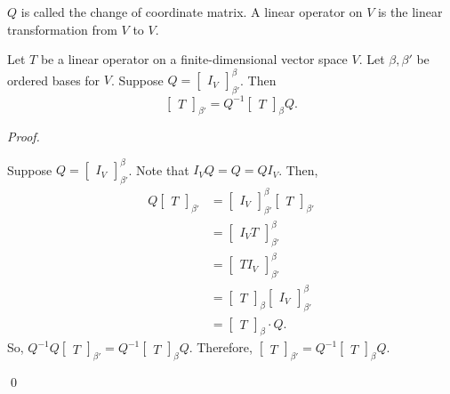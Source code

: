 \documentclass[12pt]{article}
\newenvironment{theorem}[2][Theorem]{\begin{trivlist}
\item[\hskip \labelsep {\bfseries #1}\hskip \labelsep {\bfseries #2.}]}{\end{trivlist}}
\newenvironment{sol}
    {\emph{Proof.}
    }
    {
    \qed
    }
\begin{document}
\noindent $Q$ is called the change of coordinate matrix. A linear operator on $V$ is the linear transformation from $V$ to $V$.

\begin{theorem}{2.23}
Let $T$ be a linear operator on a finite-dimensional vector space $V$. Let $\beta, \beta'$ be ordered bases for $V$. Suppose $Q = \begin{bmatrix} I_V \end{bmatrix}_{\beta'}^\beta$. Then $$\begin{bmatrix} T \end{bmatrix}_{\beta'} = Q^{-1}\begin{bmatrix} T \end{bmatrix}_\beta Q.$$
\end{theorem}

\begin{sol}
Suppose $Q = \begin{bmatrix} I_V \end{bmatrix}_{\beta '}^\beta$. Note that $I_VQ = Q = QI_V$. Then, \begin{align*}
    Q\begin{bmatrix} T \end{bmatrix}_{\beta '} &= \begin{bmatrix} I_V \end{bmatrix}_{\beta '}^\beta\begin{bmatrix} T \end{bmatrix}_{\beta '} \\
    &= \begin{bmatrix} I_VT \end{bmatrix}_{\beta '}^\beta \\
    &= \begin{bmatrix} TI_V \end{bmatrix}_{\beta '}^\beta \\
    &= \begin{bmatrix} T \end{bmatrix}_\beta \begin{bmatrix} I_V \end{bmatrix}_{\beta '}^\beta \\
    &= \begin{bmatrix} T \end{bmatrix}_\beta \cdot Q.
\end{align*} So, $Q^{-1}Q\begin{bmatrix} T \end{bmatrix}_{\beta '} = Q^{-1}\begin{bmatrix} T \end{bmatrix}_\beta Q$. Therefore, $\begin{bmatrix} T \end{bmatrix}_{\beta '} = Q^{-1} \begin{bmatrix} T \end{bmatrix}_\beta Q$.
\end{sol}
\end{document}
